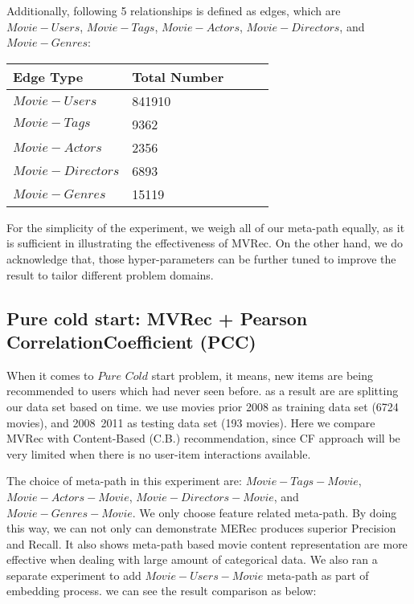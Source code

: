 Additionally, following 5 relationships is defined as edges, which are $Movie-Users$, $Movie-Tags$, $Movie-Actors$, $Movie-Directors$, and $Movie-Genres$:

\begin{center}
    \begin{tabular}{|l|l|l|l|l|}
    \hline
     \textbf{Edge Type} & \textbf{Total Number} \\ \hline
     $Movie-Users$ &  841910\\ \hline
     $Movie-Tags$ &   9362 \\ \hline
     $Movie-Actors$ &  2356 \\ \hline
     $Movie-Directors$ &  6893 \\ \hline
     $Movie-Genres$ &  15119 \\ \hline
    \end{tabular}
\end{center}

For the simplicity of the experiment, we weigh all of our meta-path equally, as it is sufficient in illustrating the effectiveness of MVRec. On the other hand, we do acknowledge that, those hyper-parameters can be further tuned to improve the result to tailor different problem domains. 


\subsection{Pure cold start: MVRec + Pearson CorrelationCoefficient (PCC)}
When it comes to $Pure$ $Cold$ start problem, it means, new items are being recommended to users which had never seen before. as a result are are splitting our data set based on time.
we use movies prior 2008 as training data set (6724 movies), and 2008~2011 as testing data set (193 movies). Here we compare MVRec with Content-Based (C.B.) recommendation, since CF approach will be very limited when there is no user-item interactions available.

The choice of meta-path in this experiment are: $Movie-Tags-Movie$, $Movie-Actors-Movie$, $Movie-Directors-Movie$, and $Movie-Genres-Movie$. We only choose feature related meta-path. By doing this way, we can not only can demonstrate MERec produces superior Precision and Recall. It also shows meta-path based movie content representation are more effective when dealing with large amount of categorical data. 
We also ran a separate experiment to add $Movie-Users-Movie$ meta-path as part of embedding process. we can see the result comparison as below:

